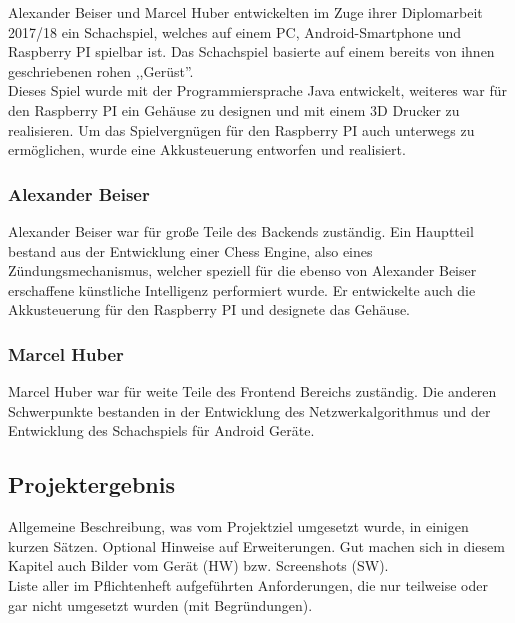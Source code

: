 \documentclass[12pt,a4paper]{article}
\newcommand{\yhbu}[0]{\color{ydkbu}}	%
\begin{document}
{	Alexander Beiser und Marcel Huber entwickelten im Zuge ihrer Diplomarbeit 2017/18 ein Schachspiel, welches auf einem PC, Android-Smartphone und Raspberry PI spielbar ist. Das Schachspiel basierte auf einem bereits von ihnen geschriebenen rohen ,,Gerüst''. \\
	Dieses Spiel wurde mit der Programmiersprache Java entwickelt, weiteres war für den Raspberry PI ein Gehäuse zu designen und mit einem 3D Drucker zu realisieren. Um das Spielvergnügen für den Raspberry PI auch unterwegs zu ermöglichen, wurde eine Akkusteuerung entworfen und realisiert. \\
	\subsubsection{Alexander Beiser}
	Alexander Beiser war für große Teile des Backends zuständig. Ein Hauptteil bestand aus der Entwicklung einer Chess Engine, also eines Zündungsmechanismus, welcher speziell für die ebenso von Alexander Beiser erschaffene künstliche Intelligenz performiert wurde. Er entwickelte auch die Akkusteuerung für den Raspberry PI und designete das Gehäuse.
	
	\subsubsection{Marcel Huber}
	Marcel Huber war für weite Teile des Frontend Bereichs zuständig. Die anderen Schwerpunkte bestanden in der Entwicklung des Netzwerkalgorithmus und der Entwicklung des Schachspiels für Android Geräte. 
 
	\vfill
	\newpage	
	
 \subsection{Projektergebnis}
	{\yhbu
	Allgemeine Beschreibung, was vom Projektziel umgesetzt wurde, in einigen kurzen Sätzen.
	Optional Hinweise auf Erweiterungen.
	Gut machen sich in diesem Kapitel auch Bilder vom Gerät (HW) bzw. Screenshots (SW).
	\\[1mm]
	Liste aller im Pflichtenheft aufgeführten Anforderungen,
	die nur teilweise oder gar nicht umgesetzt wurden (mit Begründungen).
	}










}
\end{document}
